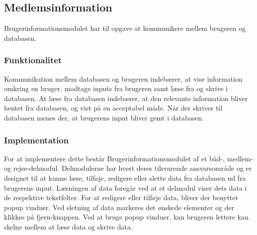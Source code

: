 \subsection{Medlemsinformation}
\label{sub:Medlemsinformation}

Brugerinformationsmodulet har til opgave at kommunikere mellem brugeren og databasen.

\subsubsection{Funktionalitet}
\label{ssub:Medlemsinformation_funktionalitet}

Kommunikation mellem databasen og brugeren indebærer, at vise information omkring en bruger, modtage inputs fra brugeren samt læse fra og skrive i databasen. At læse fra databasen indebærer, at den relevante information bliver hentet fra databasen, og vist på en acceptabel måde. Når der skrives til databasen menes der, at brugerens input bliver gemt i databasen. 

\subsubsection{Implementation}
\label{ssub:Medlemsinformation_implementation}

For at implementere dette består Brugerinformationsmodulet af et båd-, medlem- og rejse-delmodul. Delmodulerne har hvert deres tilsvarende ansvarsområde og er designet til at kunne læse, tilføje, redigere eller slette data fra databasen ud fra brugerens input. Læsningen af data foregår ved at et delmodul viser dets data i de respektive tekstfelter. For at redigere eller tilføje data, bliver der benyttet popup vinduer. Ved sletning af data markeres det ønskede elementer og der klikkes på fjern-knappen. Ved at bruge popup vinduer, kan brugeren lettere kan skelne mellem at læse data og skrive data.